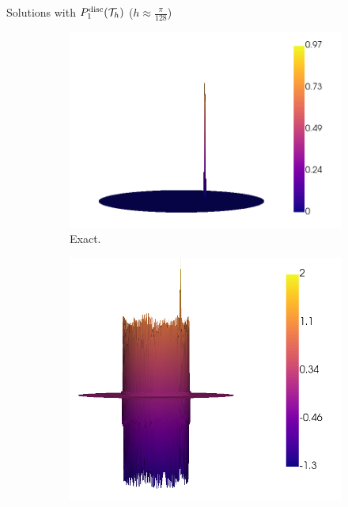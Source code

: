 			\begin{frame}{Solutions with $\relax{P}^{\text{disc}}_1(\mathcal{T}_h)$ ($h\approx\frac{\pi}{128}$)}
				\vspace*{-0.5cm}
				\begin{figure}[h!]
					\begin{subfigure}[b]{0.49\textwidth}
						\centering
						\includegraphics[scale=0.16]{img/Conveccion_Reaccion/strong/conv_react_u_ex_nx-256.png}
						\caption{Exact.}
					\end{subfigure}
					\begin{subfigure}[b]{0.49\textwidth}
						\centering
						\includegraphics[scale=0.16]{img/Conveccion_Reaccion/strong/conv_react_u_FE_nx-256.png}

\end{subfigure}
\end{figure}
\end{frame}
